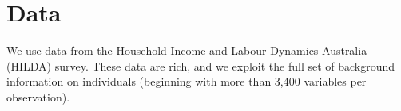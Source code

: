 \documentclass[12pt, a4paper]{article}
\begin{document}
%
%
%
%

\section{Data}

We use data from the Household Income and Labour Dynamics Australia (HILDA)
survey. These data are rich, and we exploit the full set of background
information on individuals (beginning with more than 3,400 variables per
observation).
\end{document}
